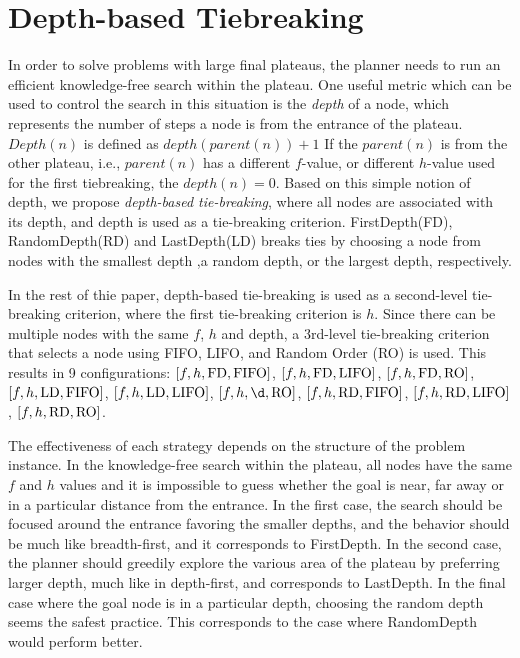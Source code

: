 \section{Depth-based Tiebreaking}

In order to solve problems with large final plateaus, the
planner needs to run an efficient knowledge-free search within the
plateau.  One useful metric which can be used to control the search in this
situation is the \emph{depth} of a node, which represents the number 
of steps a node is from the entrance of the plateau.
$Depth(n)$ is defined as $depth(parent(n)) + 1$
If the $parent(n)$ is from the other plateau, i.e., $parent(n)$ has a different $f$-value, or different $h$-value used for the first
tiebreaking, the $depth(n) = 0$. 
Based on this simple notion of depth,
we propose  \emph{depth-based tie-breaking}, where all nodes are associated with its depth, 
and depth is used as a tie-breaking criterion.
FirstDepth(FD), RandomDepth(RD) and LastDepth(LD) breaks ties by choosing a node from 
nodes with the smallest depth ,a random depth, or the largest depth, respectively.

In the rest of thie paper, depth-based tie-breaking is used as a second-level tie-breaking criterion,
where the first tie-breaking criterion is $h$.
Since there can be multiple nodes with the same $f$, $h$ and depth,
a 3rd-level tie-breaking criterion that selects a node using FIFO, LIFO, and Random Order (RO) is used.
This results in 9 configurations:
$[f,h,\mbox{FD},\mbox{FIFO}]$, $[f,h,\mbox{FD},\mbox{LIFO}]$, $[f,h,\mbox{FD},\mbox{RO}]$, $[f,h,\mbox{LD},\mbox{FIFO}]$, $[f,h,\mbox{LD},\mbox{LIFO}]$, $[f,h,\d,\ro]$, $[f,h,\mbox{RD},\mbox{FIFO}]$, $[f,h,\mbox{RD},\mbox{LIFO}]$, $[f,h,\mbox{RD},\mbox{RO}]$.

The effectiveness of each strategy depends on the structure of the problem instance.
In the knowledge-free search within the plateau, all nodes have the same
$f$ and $h$ values %
 and it is impossible to guess whether the goal is near, far
away or in a particular distance from the entrance. 
In the first case,
the search should be focused around the entrance favoring the smaller
depths, and the behavior should be much like breadth-first, and it
corresponds to FirstDepth. In the second case, the planner should
greedily explore the various area of the plateau by preferring larger
depth, much like in depth-first, and corresponds to LastDepth. In the
final case where the goal node is in a particular depth, choosing the
random depth seems the safest practice. This corresponds to the case
where RandomDepth would perform better.


